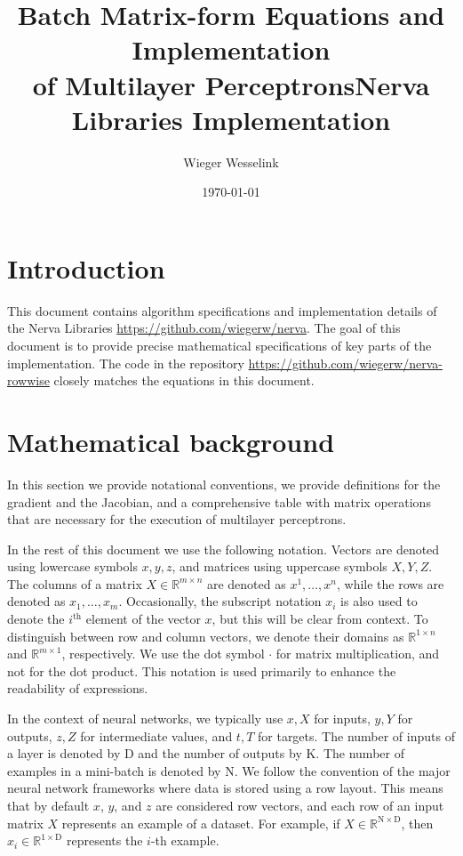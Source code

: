 \documentclass{article}
\newcommand{\const}[1]{\ensuremath{\mathrm{#1}}} %
\newcommand{\Reals}{\mathbb{R}}
\begin{document}
\title{\centering Batch Matrix-form Equations and Implementation \\ of Multilayer Perceptrons}

\title{Nerva Libraries Implementation}
\author{Wieger Wesselink}
\date{\today}

\maketitle

\tableofcontents

\section{Introduction}
This document contains algorithm specifications and implementation details of the Nerva Libraries \url{https://github.com/wiegerw/nerva}. The goal of this document is to provide precise mathematical specifications of key parts of the implementation. The code in the repository \url{https://github.com/wiegerw/nerva-rowwise} closely matches the equations in this document.

\section{Mathematical background} \label{section:mathematical-background}
In this section we provide notational conventions, we provide definitions for the gradient and the Jacobian, and a comprehensive table with matrix operations that are necessary for the execution of multilayer perceptrons.

In the rest of this document we use the following notation. Vectors are denoted using lowercase symbols $x, y, z$, and matrices using uppercase symbols $X, Y, Z$. The columns of a matrix $X \in \Reals^{m \times n}$ are denoted as $x^1, \ldots, x^n$, while the rows are denoted as $x_1, \ldots, x_m$. Occasionally, the subscript notation $x_i$ is also used to denote the $i^\text{th}$ element of the vector $x$, but this will be clear from context.
To distinguish between row and column vectors, we denote their domains as $\Reals^{1 \times n}$ and $\Reals^{m \times 1}$, respectively. We use the dot symbol $\cdot$ for matrix multiplication, and not for the dot product. This notation is used primarily to enhance the readability of expressions.

In the context of neural networks, we typically use $x, X$ for inputs, $y, Y$ for outputs, $z, Z$ for intermediate values, and $t, T$ for targets. The number of inputs of a layer is denoted by $\const{D}$ and the number of outputs by $\const{K}$. The number of examples in a mini-batch is denoted by $\const{N}$.
We follow the convention of the major neural network frameworks where data is stored using a row layout. This means that by default $x$, $y$, and $z$ are considered row vectors, and each row of an input matrix $X$ represents an example of a dataset. For example, if $X \in \Reals^{\const{N} \times \const{D}}$, then $x_i \in \Reals^{1 \times \const{D}}$ represents the $i$-th example.
\end{document}
